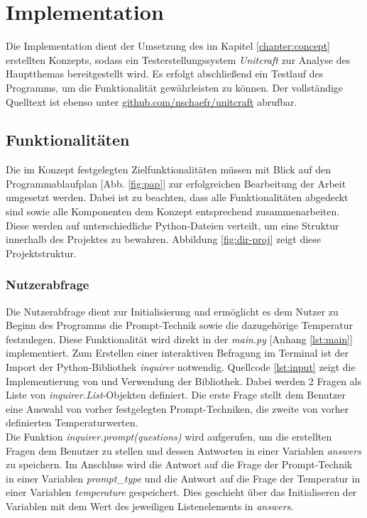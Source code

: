 \chapter{Implementation}\label{chapter:impl}
Die Implementation dient der Umsetzung des im Kapitel \ref{chapter:concept} erstellten Konzepts, sodass ein Testerstellungssystem \textit{Unitcraft} zur Analyse des Hauptthemas bereitgestellt wird. Es erfolgt abschließend ein Testlauf des Programms, um die Funktionalität gewährleisten zu können. Der vollständige Quelltext ist ebenso unter \href{https://github.com/nschaefr/unitcraft}{github.com/nschaefr/unitcraft} abrufbar.

\section{Funktionalitäten}
Die im Konzept festgelegten Zielfunktionalitäten müssen mit Blick auf den Programmablaufplan [Abb. \ref{fig:pap}] zur erfolgreichen Bearbeitung der Arbeit umgesetzt werden. Dabei ist zu beachten, dass alle Funktionalitäten abgedeckt sind sowie alle Komponenten dem Konzept entsprechend zusammenarbeiten. Diese werden auf unterschiedliche Python-Dateien verteilt, um eine Struktur innerhalb des Projektes zu bewahren. Abbildung \ref{fig:dir-proj} zeigt diese Projektstruktur.

\subsection{Nutzerabfrage}
Die Nutzerabfrage dient zur Initialisierung und ermöglicht es dem Nutzer zu Beginn des Programms die Prompt-Technik sowie die dazugehörige Temperatur festzulegen. Diese Funktionalität wird direkt in der \textit{main.py} [Anhang \ref{lst:main}] implementiert. Zum Erstellen einer interaktiven Befragung im Terminal ist der Import der Python-Bibliothek \textit{inquirer} notwendig. Quellcode \ref{lst:input} zeigt die Implementierung von und Verwendung der Bibliothek. Dabei werden 2 Fragen als Liste von \textit{inquirer.List}-Objekten definiert. Die erste Frage stellt dem Benutzer eine Auswahl von vorher festgelegten Prompt-Techniken, die zweite von vorher definierten Temperaturwerten.\\
\vspace{-.3cm}
Die Funktion \textit{inquirer.prompt(questions)} wird aufgerufen, um die erstellten Fragen dem Benutzer zu stellen und dessen Antworten in einer Variablen \textit{answers} zu speichern. Im Anschluss wird die Antwort auf die Frage der Prompt-Technik in einer Variablen \textit{prompt\_type} und die Antwort auf die Frage der Temperatur in einer Variablen \textit{temperature} gespeichert. Dies geschieht über das Initialiseren der Variablen mit dem Wert des jeweiligen Listenelements in \textit{answers}.

